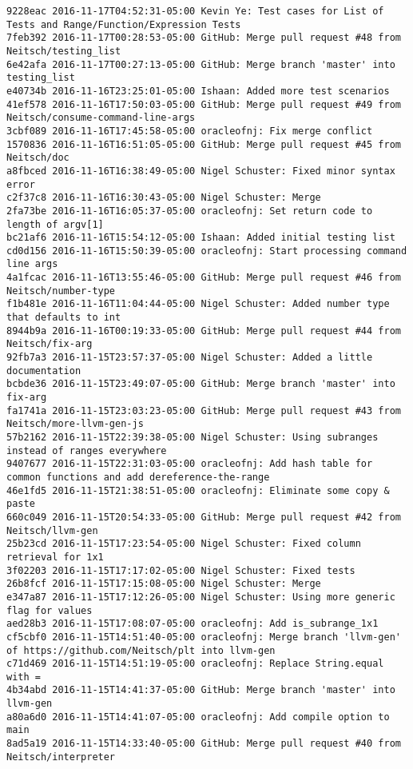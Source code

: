 \begin{lstlisting}
9228eac 2016-11-17T04:52:31-05:00 Kevin Ye: Test cases for List of Tests and Range/Function/Expression Tests
7feb392 2016-11-17T00:28:53-05:00 GitHub: Merge pull request #48 from Neitsch/testing_list
6e42afa 2016-11-17T00:27:13-05:00 GitHub: Merge branch 'master' into testing_list
e40734b 2016-11-16T23:25:01-05:00 Ishaan: Added more test scenarios
41ef578 2016-11-16T17:50:03-05:00 GitHub: Merge pull request #49 from Neitsch/consume-command-line-args
3cbf089 2016-11-16T17:45:58-05:00 oracleofnj: Fix merge conflict
1570836 2016-11-16T16:51:05-05:00 GitHub: Merge pull request #45 from Neitsch/doc
a8fbced 2016-11-16T16:38:49-05:00 Nigel Schuster: Fixed minor syntax error
c2f37c8 2016-11-16T16:30:43-05:00 Nigel Schuster: Merge
2fa73be 2016-11-16T16:05:37-05:00 oracleofnj: Set return code to length of argv[1]
bc21af6 2016-11-16T15:54:12-05:00 Ishaan: Added initial testing list
cd0d156 2016-11-16T15:50:39-05:00 oracleofnj: Start processing command line args
4a1fcac 2016-11-16T13:55:46-05:00 GitHub: Merge pull request #46 from Neitsch/number-type
f1b481e 2016-11-16T11:04:44-05:00 Nigel Schuster: Added number type that defaults to int
8944b9a 2016-11-16T00:19:33-05:00 GitHub: Merge pull request #44 from Neitsch/fix-arg
92fb7a3 2016-11-15T23:57:37-05:00 Nigel Schuster: Added a little documentation
bcbde36 2016-11-15T23:49:07-05:00 GitHub: Merge branch 'master' into fix-arg
fa1741a 2016-11-15T23:03:23-05:00 GitHub: Merge pull request #43 from Neitsch/more-llvm-gen-js
57b2162 2016-11-15T22:39:38-05:00 Nigel Schuster: Using subranges instead of ranges everywhere
9407677 2016-11-15T22:31:03-05:00 oracleofnj: Add hash table for common functions and add dereference-the-range
46e1fd5 2016-11-15T21:38:51-05:00 oracleofnj: Eliminate some copy & paste
660c049 2016-11-15T20:54:33-05:00 GitHub: Merge pull request #42 from Neitsch/llvm-gen
25b23cd 2016-11-15T17:23:54-05:00 Nigel Schuster: Fixed column retrieval for 1x1
3f02203 2016-11-15T17:17:02-05:00 Nigel Schuster: Fixed tests
26b8fcf 2016-11-15T17:15:08-05:00 Nigel Schuster: Merge
e347a87 2016-11-15T17:12:26-05:00 Nigel Schuster: Using more generic flag for values
aed28b3 2016-11-15T17:08:07-05:00 oracleofnj: Add is_subrange_1x1
cf5cbf0 2016-11-15T14:51:40-05:00 oracleofnj: Merge branch 'llvm-gen' of https://github.com/Neitsch/plt into llvm-gen
c71d469 2016-11-15T14:51:19-05:00 oracleofnj: Replace String.equal with =
4b34abd 2016-11-15T14:41:37-05:00 GitHub: Merge branch 'master' into llvm-gen
a80a6d0 2016-11-15T14:41:07-05:00 oracleofnj: Add compile option to main
8ad5a19 2016-11-15T14:33:40-05:00 GitHub: Merge pull request #40 from Neitsch/interpreter

\end{lstlisting}
